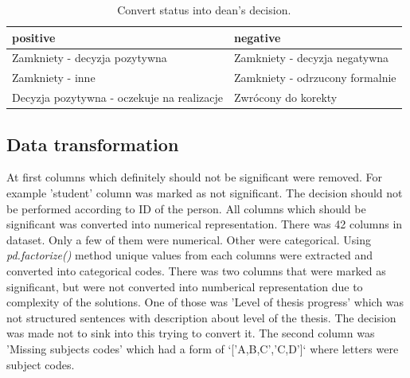 \begin{table}
    \caption{Convert status into dean's decision.}
    \label{table:positive_negative}
    \begin{tabular}{|p{}|p{}|}
        \hline
            \textbf{positive} & \textbf{negative} \\
        \hline
            Zamkniety - decyzja pozytywna & Zamkniety - decyzja negatywna \\ 
        \hline
            Zamkniety - inne & Zamkniety - odrzucony formalnie \\
        \hline
            Decyzja pozytywna - oczekuje na realizacje & Zwrócony do korekty \\
        \hline
        
    \end{tabular}
    
\end{table}


\subsection{Data transformation}
At first columns which definitely should not be significant were removed. For example 'student' column was marked as not significant. The decision should not be performed according to ID of the person. All columns which should be significant was converted into numerical representation.
There was 42 columns in dataset. Only a few of them were numerical. Other were categorical. Using \textit{pd.factorize()} method unique values from each columns were extracted and converted into categorical codes.
There was two columns that were marked as significant, but were not converted into numberical representation due to complexity of the solutions. One of those was 'Level of thesis progress' which was not structured sentences with description about level of the thesis. The decision was made not to sink into this trying to convert it. The second column was 'Missing subjects codes' which had a form of `['A,B,C','C,D']` where letters were subject codes.
